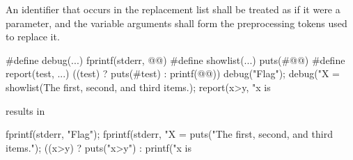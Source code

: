 \pnum
{}%
An identifier  that occurs in the replacement list
shall be treated as if it were a parameter, and the variable arguments shall form
the preprocessing tokens used to replace it.

\pnum
\begin{example}
\begin{codeblock}
#define debug(...) fprintf(stderr, @@)
#define showlist(...) puts(#@@)
#define report(test, ...) ((test) ? puts(#test) : printf(@@))
debug("Flag");
debug("X = %
showlist(The first, second, and third items.);
report(x>y, "x is %
\end{codeblock}
results in
\begin{codeblock}
fprintf(stderr, "Flag");
fprintf(stderr, "X = %
puts("The first, second, and third items.");
((x>y) ? puts("x>y") : printf("x is %
\end{codeblock}
\end{example}

